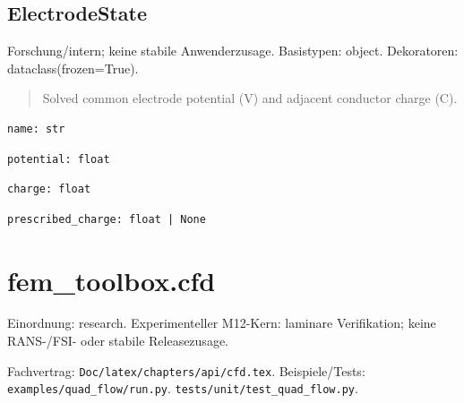 \subsection{ElectrodeState}
Forschung/intern; keine stabile Anwenderzusage.
Basistypen: object. Dekoratoren: dataclass(frozen=True).
\begin{quote}
Solved common electrode potential (V) and adjacent conductor charge (C).
\end{quote}
\begin{lstlisting}
name: str
\end{lstlisting}
\begin{lstlisting}
potential: float
\end{lstlisting}
\begin{lstlisting}
charge: float
\end{lstlisting}
\begin{lstlisting}
prescribed_charge: float | None
\end{lstlisting}
\section{fem\_toolbox.cfd}
Einordnung: research. Experimenteller M12-Kern: laminare Verifikation; keine RANS-/FSI- oder stabile Releasezusage.
\par Fachvertrag: \nolinkurl{Doc/latex/chapters/api/cfd.tex}. Beispiele/Tests:
\nolinkurl{examples/quad_flow/run.py}.
\nolinkurl{tests/unit/test_quad_flow.py}.
